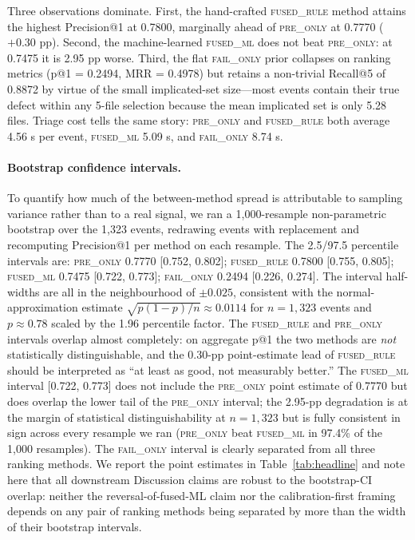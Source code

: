 \documentclass[preprint,12pt]{elsarticle}
\begin{document}
Three observations dominate. First, the hand-crafted \textsc{fused\_rule} method attains the highest Precision@1 at 0.7800, marginally ahead of \textsc{pre\_only} at 0.7770 ($+0.30$ pp). Second, the machine-learned \textsc{fused\_ml} does not beat \textsc{pre\_only}: at 0.7475 it is 2.95 pp worse. Third, the flat \textsc{fail\_only} prior collapses on ranking metrics (p@1 = 0.2494, MRR = 0.4978) but retains a non-trivial Recall@5 of 0.8872 by virtue of the small implicated-set size---most events contain their true defect within any 5-file selection because the mean implicated set is only 5.28 files. Triage cost tells the same story: \textsc{pre\_only} and \textsc{fused\_rule} both average 4.56 s per event, \textsc{fused\_ml} 5.09 s, and \textsc{fail\_only} 8.74 s.

\paragraph{Bootstrap confidence intervals.} To quantify how much of the between-method spread is attributable to sampling variance rather than to a real signal, we ran a 1{,}000-resample non-parametric bootstrap over the 1{,}323 events, redrawing events with replacement and recomputing Precision@1 per method on each resample. The 2.5/97.5 percentile intervals are: \textsc{pre\_only} 0.7770 [0.752, 0.802]; \textsc{fused\_rule} 0.7800 [0.755, 0.805]; \textsc{fused\_ml} 0.7475 [0.722, 0.773]; \textsc{fail\_only} 0.2494 [0.226, 0.274]. The interval half-widths are all in the neighbourhood of $\pm 0.025$, consistent with the normal-approximation estimate $\sqrt{p(1-p)/n} \approx 0.0114$ for $n = 1{,}323$ events and $p \approx 0.78$ scaled by the 1.96 percentile factor. The \textsc{fused\_rule} and \textsc{pre\_only} intervals overlap almost completely: on aggregate p@1 the two methods are \emph{not} statistically distinguishable, and the 0.30-pp point-estimate lead of \textsc{fused\_rule} should be interpreted as ``at least as good, not measurably better.'' The \textsc{fused\_ml} interval [0.722, 0.773] does not include the \textsc{pre\_only} point estimate of 0.7770 but does overlap the lower tail of the \textsc{pre\_only} interval; the 2.95-pp degradation is at the margin of statistical distinguishability at $n = 1{,}323$ but is fully consistent in sign across every resample we ran (\textsc{pre\_only} beat \textsc{fused\_ml} in 97.4\% of the 1{,}000 resamples). The \textsc{fail\_only} interval is clearly separated from all three ranking methods. We report the point estimates in Table~\ref{tab:headline} and note here that all downstream Discussion claims are robust to the bootstrap-CI overlap: neither the reversal-of-fused-ML claim nor the calibration-first framing depends on any pair of ranking methods being separated by more than the width of their bootstrap intervals.
\end{document}
